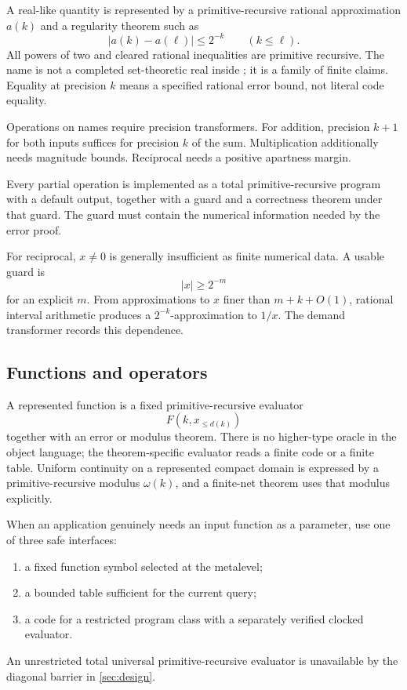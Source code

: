 A real-like quantity is represented by a primitive-recursive rational approximation \(a(k)\) and a regularity theorem such as
\begin{equation}
  |a(k)-a(\ell)|\leq 2^{-k}
  \qquad(k\leq\ell).
  \label{eq:regular-name}
\end{equation}
All powers of two and cleared rational inequalities are primitive recursive.  The name is not a completed set-theoretic real inside \iPRA; it is a family of finite claims.  Equality at precision \(k\) means a specified rational error bound, not literal code equality.

Operations on names require precision transformers.  For addition, precision \(k+1\) for both inputs suffices for precision \(k\) of the sum.  Multiplication additionally needs magnitude bounds.  Reciprocal needs a positive apartness margin.

\begin{principle}
Every partial operation is implemented as a total primitive-recursive program with a default output, together with a guard and a correctness theorem under that guard.  The guard must contain the numerical information needed by the error proof.
\end{principle}

For reciprocal, \(x\neq0\) is generally insufficient as finite numerical data.  A usable guard is
\begin{equation}
  |x|\geq 2^{-m}
  \label{eq:apartness-margin}
\end{equation}
for an explicit \(m\).  From approximations to \(x\) finer than \(m+k+O(1)\), rational interval arithmetic produces a \(2^{-k}\)-approximation to \(1/x\).  The demand transformer records this dependence.

\subsection{Functions and operators}

A represented function is a fixed primitive-recursive evaluator
\[
  F(k,x_{\leq d(k)})
\]
together with an error or modulus theorem.  There is no higher-type oracle in the object language; the theorem-specific evaluator reads a finite code or a finite table.  Uniform continuity on a represented compact domain is expressed by a primitive-recursive modulus \(\omega(k)\), and a finite-net theorem uses that modulus explicitly.

When an application genuinely needs an input function as a parameter, use one of three safe interfaces:
\begin{enumerate}[label=(\roman*),leftmargin=2.3em]
\item a fixed function symbol selected at the metalevel;
\item a bounded table sufficient for the current query;
\item a code for a restricted program class with a separately verified clocked evaluator.
\end{enumerate}
An unrestricted total universal primitive-recursive evaluator is unavailable by the diagonal barrier in \cref{sec:design}.

